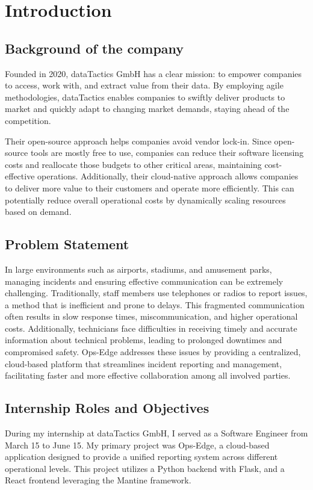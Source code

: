 \chapter{Introduction}
\label{ch:intro}

\section{Background of the company}
\label{sec:intro:background}
Founded in 2020, dataTactics GmbH has a clear mission: to empower companies to access, work with, and extract value from their data. By employing agile methodologies, dataTactics enables companies to swiftly deliver products to market and quickly adapt to changing market demands, staying ahead of the competition.

Their open-source approach helps companies avoid vendor lock-in. Since open-source tools are mostly free to use, companies can reduce their software licensing costs and reallocate those budgets to other critical areas, maintaining cost-effective operations. Additionally, their cloud-native approach allows companies to deliver more value to their customers and operate more efficiently. This can potentially reduce overall operational costs by dynamically scaling resources based on demand.

%
%
\section{Problem Statement}
\label{sec:intro:problem_statement}
In large environments such as airports, stadiums, and amusement parks, managing incidents and ensuring effective communication can be extremely challenging. Traditionally, staff members use telephones or radios to report issues, a method that is inefficient and prone to delays. This fragmented communication often results in slow response times, miscommunication, and higher operational costs. Additionally, technicians face difficulties in receiving timely and accurate information about technical problems, leading to prolonged downtimes and compromised safety. Ops-Edge addresses these issues by providing a centralized, cloud-based platform that streamlines incident reporting and management, facilitating faster and more effective collaboration among all involved parties.

%
%
\section{Internship Roles and Objectives}
\label{sec:intro:internship_roles_and_objectives}
During my internship at dataTactics GmbH, I served as a Software Engineer from March 15 to June 15. My primary project was Ops-Edge, a cloud-based application designed to provide a unified reporting system across different operational levels. This project utilizes a Python backend with Flask, and a React frontend leveraging the Mantine framework.

